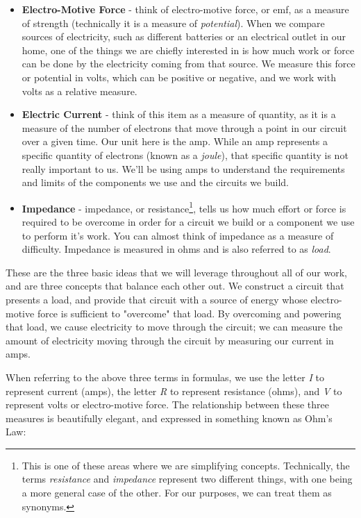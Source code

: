 \documentclass[10pt]{report}
\begin{document}
\begin{itemize}
\item \textbf{Electro-Motive Force} - think of electro-motive force, or emf, as a measure of strength (technically it is a measure of \textit{potential}). When we compare sources of electricity, such as different batteries or an electrical outlet in our home, one of the things we are chiefly interested in is how much work or force can be done by the electricity coming from that source. We measure this force or potential in volts, which can be positive or negative, and we work with volts as a relative measure.
\item \textbf{Electric Current} - think of this item as a measure of quantity, as it is a measure of the number of electrons that move through a point in our circuit over a given time. Our unit here is the amp. While an amp represents a specific quantity of electrons (known as a \textit{joule}), that specific quantity is not really important to us. We'll be using amps to understand the  requirements and limits of the components we use and the circuits we build. 
\item \textbf{Impedance} - impedance, or resistance\footnote{This is one of these areas where we are simplifying concepts. Technically, the terms \textit{resistance} and \textit{impedance} represent two different things, with one being a more general case of the other. For our purposes, we can treat them as synonyms.}, tells us how much effort or force is required to be overcome in order for a circuit we build or a component we use to perform it's work. You can almost think of impedance as a measure of difficulty. Impedance is measured in ohms and is also referred to as \textit{load}.
\end{itemize}

These are the three basic ideas that we will leverage throughout all of our work, and are three concepts that balance each other out. We construct a circuit that presents a load, and provide that circuit with a source of energy whose electro-motive force is sufficient to "overcome" that load. By overcoming and powering that load, we cause electricity to move through the circuit; we can measure the amount of electricity moving through the circuit by measuring our current in amps.

When referring to the above three terms in formulas, we use the letter \textit{I} to represent current (amps), the letter \textit{R} to represent resistance (ohms), and \textit{V} to represent volts or electro-motive force. The relationship between these three measures is beautifully elegant, and expressed in something known as Ohm's Law:
\end{document}
